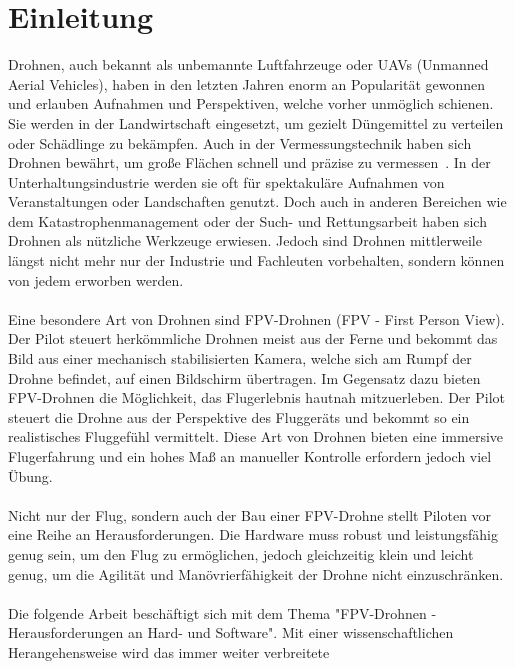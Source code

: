 
\section[Einleitung]{Einleitung}
    Drohnen, auch bekannt als unbemannte Luftfahrzeuge oder UAVs (Unmanned Aerial Vehicles),
    haben in den letzten Jahren enorm an Popularität gewonnen und erlauben Aufnahmen und Perspektiven, welche
    vorher unmöglich schienen. Sie werden in der Landwirtschaft eingesetzt, um gezielt Düngemittel
    zu verteilen oder Schädlinge zu bekämpfen. Auch in der Vermessungstechnik haben sich Drohnen
    bewährt, um große Flächen schnell und präzise zu vermessen~\cite{TheSkyistheLimit?}. In der Unterhaltungsindustrie werden
    sie oft für spektakuläre Aufnahmen von Veranstaltungen oder Landschaften genutzt. Doch
    auch in anderen Bereichen wie dem Katastrophenmanagement oder der Such- und Rettungsarbeit
    haben sich Drohnen als nützliche Werkzeuge erwiesen. Jedoch sind Drohnen mittlerweile
    längst nicht mehr nur der Industrie und Fachleuten vorbehalten, sondern können von jedem
    erworben werden.\\ 
    \\
    Eine besondere Art von Drohnen sind FPV-Drohnen (FPV - First Person View). Der Pilot
    steuert herkömmliche Drohnen meist aus der Ferne und bekommt das Bild aus einer mechanisch
    stabilisierten Kamera, welche sich am Rumpf der Drohne befindet, auf einen Bildschirm
    übertragen. Im Gegensatz dazu bieten FPV-Drohnen die Möglichkeit, das Flugerlebnis hautnah
    mitzuerleben. Der Pilot steuert die Drohne aus der Perspektive des Fluggeräts und bekommt
    so ein realistisches Fluggefühl vermittelt. Diese Art von Drohnen bieten eine immersive
    Flugerfahrung und ein hohes Maß an manueller Kontrolle erfordern jedoch viel Übung. \\
    \\
    Nicht nur der Flug, sondern auch der Bau einer FPV-Drohne stellt Piloten vor eine Reihe
    an Herausforderungen. Die Hardware muss robust und leistungsfähig genug sein, um den
    Flug zu ermöglichen, jedoch gleichzeitig klein und leicht genug, um die Agilität und
    Manövrierfähigkeit der Drohne nicht einzuschränken.\\
    \\
    Die folgende Arbeit beschäftigt sich mit dem Thema "FPV-Drohnen - Herausforderungen an Hard- und
    Software". Mit einer wissenschaftlichen Herangehensweise wird das immer weiter verbreitete
